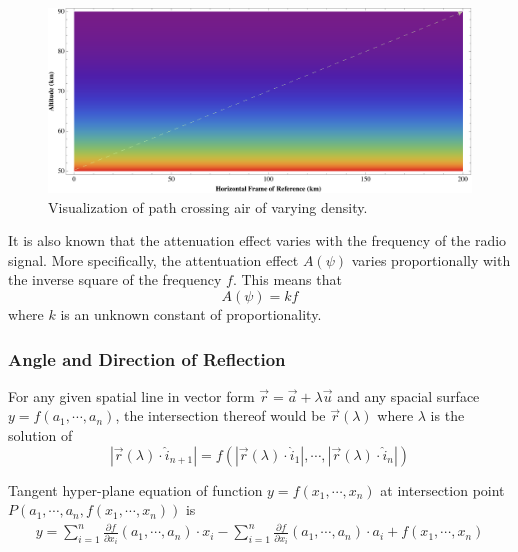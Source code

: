 \documentclass{article}
\begin{document}
\begin{figure}[htbp]
    \centering
    \includegraphics[scale=.51]{pressure_density_plot.pdf}
    \caption{Visualization of path crossing air of varying density.}
    \label{fig:pressure_density_plot}
\end{figure}

It is also known that the attenuation effect varies with the frequency of the radio signal. More specifically, the attentuation effect $A(\psi)$ varies proportionally with the inverse square of the frequency $f$. This means that
\begin{equation}
    A(\psi) = kf
\end{equation}
where $k$ is an unknown constant of proportionality. 


\subsubsection{Angle and Direction of Reflection}
For any given spatial line in vector form $\vec{r}=\vec{a}+\lambda\vec{u}$ and any spacial surface $y=f(a_1,\cdots,a_n)$, the intersection thereof would be $\vec{r}(\lambda)$ where $\lambda$ is the solution of
\[
\left|\vec{r}(\lambda)\cdot\hat{i}_{n+1}\right|=f\left(\left|\vec{r}(\lambda)\cdot\hat{i}_{1}\right|,\cdots,\left|\vec{r}(\lambda)\cdot\hat{i}_{n}\right|\right)
\]

Tangent hyper-plane equation of function $y=f(x_1,\cdots,x_n)$ at intersection point $\displaystyle{P\left(a_1,\cdots,a_n,f\left(x_1,\cdots,x_n\right)\right)}$ is
\begin{gather}
\label{eqn:tangent_eqn_multi}
y=\sum_{i=1}^n\frac{\partial f}{\partial x_i}(a_1,\cdots,a_n)\cdot x_i-\sum_{i=1}^n\frac{\partial f}{\partial x_i}(a_1,\cdots,a_n)\cdot a_i+f(x_1,\cdots,x_n)
\end{gather}
\end{document}
